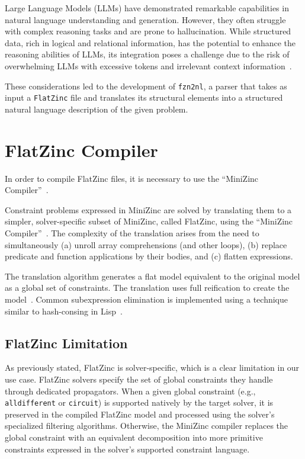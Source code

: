\documentclass[../../main]{subfiles}
\begin{document}
Large Language Models (LLMs) have demonstrated remarkable capabilities in natural language understanding and generation. However, they often struggle with complex reasoning tasks and are prone to hallucination. While structured data, rich in logical and relational information, has the potential to enhance the reasoning abilities of LLMs, its integration poses a challenge due to the risk of overwhelming LLMs with excessive tokens and irrelevant context information~\cite{LLMwStructData}.

These considerations led to the development of \texttt{fzn2nl}, a parser that takes as input a \texttt{FlatZinc} file and translates its structural elements into a structured natural language description of the given problem.

\section{FlatZinc Compiler}
\label{sec:parserCompilation}
In order to compile FlatZinc files, it is necessary to use the ``MiniZinc Compiler''~\cite{mznCompiler}. 

Constraint problems expressed in MiniZinc are solved by translating them to a simpler, solver-specific subset of MiniZinc, called FlatZinc, using the ``MiniZinc Compiler''~\cite{mznCompiler}.
The complexity of the translation arises from the need to simultaneously (a) unroll array comprehensions (and other loops), (b) replace predicate and function applications by their bodies, and (c) flatten expressions.


The translation algorithm generates a flat model equivalent to the original model as a global set of constraints. The translation uses full reification to create the model~\cite{MiniZincwFunctions}. Common subexpression elimination is implemented using a technique similar to hash-consing in Lisp~\cite{LISP}. 

\subsection{FlatZinc Limitation}
\label{sec:fznLimits}
As previously stated, FlatZinc is solver-specific, which is a clear limitation in our use case. FlatZinc solvers specify the set of global constraints they handle through dedicated propagators. When a given global constraint (e.g., \texttt{alldifferent} or \texttt{circuit}) is supported natively by the target solver, it is preserved in the compiled FlatZinc model and processed using the solver's specialized filtering algorithms. Otherwise, the MiniZinc compiler replaces the global constraint with an equivalent decomposition into more primitive constraints expressed in the solver's supported constraint language.
\end{document}
